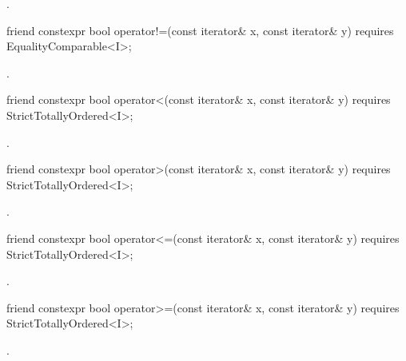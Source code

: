 \begin{itemdescr}
\pnum
\returns {}.
\end{itemdescr}

\begin{itemdecl}
friend constexpr bool operator!=(const iterator& x, const iterator& y)
  requires EqualityComparable<I>;
\end{itemdecl}

\begin{itemdescr}
\pnum
\returns {}.
\end{itemdescr}

\begin{itemdecl}
friend constexpr bool operator<(const iterator& x, const iterator& y)
  requires StrictTotallyOrdered<I>;
\end{itemdecl}

\begin{itemdescr}
\pnum
\returns {}.
\end{itemdescr}

\begin{itemdecl}
friend constexpr bool operator>(const iterator& x, const iterator& y)
  requires StrictTotallyOrdered<I>;
\end{itemdecl}

\begin{itemdescr}
\pnum
\returns {}.
\end{itemdescr}

\begin{itemdecl}
friend constexpr bool operator<=(const iterator& x, const iterator& y)
  requires StrictTotallyOrdered<I>;
\end{itemdecl}

\begin{itemdescr}
\pnum
\returns {}.
\end{itemdescr}

\begin{itemdecl}
friend constexpr bool operator>=(const iterator& x, const iterator& y)
  requires StrictTotallyOrdered<I>;
\end{itemdecl}

\begin{itemdescr}
\pnum
\returns {}.
\end{itemdescr}

